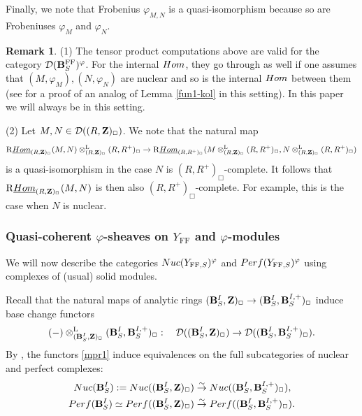 \documentclass[10pt,reqno]{amsart}
\theoremstyle{definition}
\newtheorem{remark}[equation]{Remark}
\theoremstyle{remark}
\def\phi{\varphi}
\newcommand{\Hom}{{\rm{Hom}} }
\newcommand{\uHom}{\underline{{\rm{Hom}} }}
\newcommand{\LL}{\operatorname{L} }
\newcommand{\FF}{\operatorname{FF} }
\newcommand{\sd}{{\mathcal{D}}}
\numberwithin{equation}{section}
\def\R{{\mathrm R}}
\numberwithin{equation}{section}
\begin{document}
      Finally, we note that Frobenius $\phi_{M, N}$ is a quasi-isomorphism because so are  Frobeniuses $\phi_M$ and $\phi_N$.
 \begin{remark}\label{zet1}
(1)  The tensor product computations above are valid     for the category $ \sd({\B}^{\FF}_{S})^{\phi}$. For the internal $\Hom$, they go through as well if one assumes that $(M,\phi_M), (N,\phi_N)$ are nuclear and so is the internal $\Hom$  between them (see \cite[Lemma 4.7]{ZL} for a proof of an analog of Lemma \ref{fun1-kol} in this setting). In this paper we will always be in this setting. 

(2) Let $M,N\in \sd((R,\Z)_{\Box})$. We note that the natural map 
$$
\R\uHom_{(R,\Z)_{\Box}}(M,N)\otimes^{\LL}_{(R,\Z)_{\Box}}(R,R^+)_{\Box}\to \R\uHom_{(R,R^+)_{\Box}}(M\otimes^{\LL}_{(R,\Z)_{\Box}}(R,R^+)_{\Box},N\otimes^{\LL}_{(R,\Z)_{\Box}}(R,R^+)_{\Box})
$$
is a quasi-isomorphism in the case $N$ is $(R,R^+)_{\Box}$-complete. It follows that  $\R\uHom_{(R,\Z)_{\Box}}(M,N)$ is then also  $(R,R^+)_{\Box}$-complete. For example, this is the case when $N$ is nuclear. 
 \end{remark}
      \subsubsection{Quasi-coherent $\phi$-sheaves on $Y_{\FF}$ and $\phi$-modules}
We will  now describe the categories ${\rm Nuc}(Y_{\FF,S})^{\phi}$ and ${\rm Perf}(Y_{\FF,S})^{\phi}$ using complexes of (usual) solid modules. 

  Recall that the natural maps of analytic rings
$({\bf B}_{S}^{I },{\bf Z})_{\Box}\to   ({\bf B}_{S}^{I} ,{\bf B}^{I,+}_{S} )_{\Box}$
induce base change
functors 
\begin{equation}\label{mpr1}
(-) \otimes^{\LL} _{(\B_{S}^{I },\Z)_{\Box}} (\B_{S}^{I },\B^{I,+}_{S})_{\Box} :\quad  
\sd((\B_{S}^{I }, \Z)_{\Box}) \to  \sd((\B_{S}^{I} ,\B^{I,+}_{S})_{\Box}).
 \end{equation}
 By \cite[(6.13)]{GB2}, the functors \eqref{mpr1} induce equivalences on the full subcategories of nuclear and perfect complexes:
 \begin{align}\label{kawa1}
   {\rm Nuc}(\B_{S}^{I }):= {\rm Nuc}((\B_{S}^{I }, \Z)_{\Box})  & \stackrel{\sim}{\to} {\rm Nuc}((\B_{S}^{I} ,\B^{I,+}_{S})_{\Box}),\\
      {\rm Perf}(\B_{S}^{I })\simeq  {\rm Perf}((\B_{S}^{I }, \Z)_{\Box}) & \stackrel{\sim}{\to} {\rm Perf}((\B_{S}^{I} ,\B^{I,+}_{S})_{\Box}).\notag
 \end{align}
\end{document}
